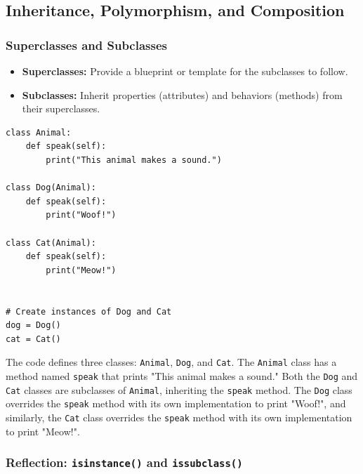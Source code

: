 
\newpage
\subsection{Inheritance, Polymorphism, and Composition}

\subsubsection{Superclasses and Subclasses}
\begin{itemize}
    \item \textbf{Superclasses:}
    Provide a blueprint or template for the subclasses to follow.
    \item \textbf{Subclasses:}
    Inherit properties (attributes) and behaviors (methods) from their superclasses.
\end{itemize}

\begin{codebox}
\begin{verbatim}
class Animal:
    def speak(self):
        print("This animal makes a sound.")

class Dog(Animal):
    def speak(self):
        print("Woof!")

class Cat(Animal):
    def speak(self):
        print("Meow!")


# Create instances of Dog and Cat
dog = Dog()
cat = Cat()
\end{verbatim}
\end{codebox}
The code defines three classes: \texttt{Animal}, \texttt{Dog}, and \texttt{Cat}. The \texttt{Animal} class has a method named \texttt{speak} that prints "This animal makes a sound." Both the \texttt{Dog} and \texttt{Cat} classes are subclasses of \texttt{Animal}, inheriting the \texttt{speak} method. The \texttt{Dog} class overrides the \texttt{speak} method with its own implementation to print "Woof!", and similarly, the \texttt{Cat} class overrides the \texttt{speak} method with its own implementation to print "Meow!".

\subsubsection{Reflection: \texttt{isinstance()} and \texttt{issubclass()}}

